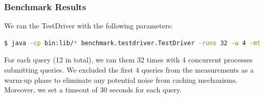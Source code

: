 \subsubsection{Benchmark Results}
We ran the TestDriver with the following parameters:
\begin{lstlisting}[language=bash, caption={BSBM TestDriver class execution}, label={lst:testdriver}]
    $ java -cp bin:lib/* benchmark.testdriver.TestDriver -runs 32 -w 4 -mt 4 -t 30000 http://localhost:7200/repositories/BSBM
\end{lstlisting}
For each query (12 in total), we ran them 32 times with 4 concurrent processes submitting queries. We excluded the first 4 queries from the measurements as a warm-up phase to eliminate any potential noise from caching mechanisms. Moreover, we set a timeout of 30 seconds for each query.

